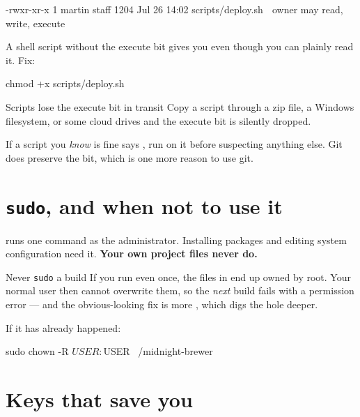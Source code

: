 \begin{trace}
-rwxr-xr-x  1 martin  staff  1204 Jul 26 14:02 scripts/deploy.sh
 ^^^
 owner may read, write, execute
\end{trace}

A shell script without the execute bit gives you  even
though you can plainly read it. Fix:

\begin{shell}
chmod +x scripts/deploy.sh
\end{shell}

\begin{trap}{Scripts lose the execute bit in transit}
Copy a script through a zip file, a Windows filesystem, or some cloud drives and
the execute bit is silently dropped.

If a script you \emph{know} is fine says , run
 on it before suspecting anything else. Git does preserve the
bit, which is one more reason to use git.
\end{trap}

\section{\texttt{sudo}, and when not to use it}

 runs one command as the administrator. Installing packages and
editing system configuration need it. \textbf{Your own project files never do.}

\begin{trap}{Never \texttt{sudo} a build}
If you run  even once, the files in  end up
owned by root. Your normal user then cannot overwrite them, so the \emph{next}
build fails with a permission error --- and the obvious-looking fix is more
, which digs the hole deeper.

If it has already happened:
\begin{shell}
sudo chown -R $USER:$USER ~/midnight-brewer
\end{shell}
\end{trap}

\section{Keys that save you}

